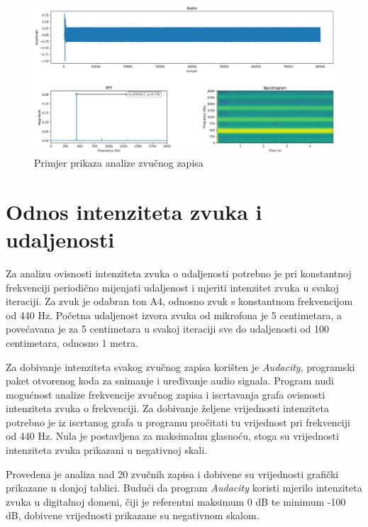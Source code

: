 \begin{figure}[ht]
	\includegraphics[width=\linewidth]{imgs/analyse_example}
	\caption{Primjer prikaza analize zvučnog zapisa}
	\label{fig:analyse_example}
\end{figure}

\section{Odnos intenziteta zvuka i udaljenosti}

Za analizu ovisnosti intenziteta zvuka o udaljenosti potrebno je pri konstantnoj frekvenciji periodično mijenjati udaljenost i mjeriti intenzitet zvuka u svakoj iteraciji. Za zvuk je odabran ton A4, odnosno zvuk s konstantnom frekvencijom od 440 Hz. Početna udaljenost izvora zvuka od mikrofona je 5 centimetara, a povećavana je za 5 centimetara u svakoj iteraciji sve do udaljenosti od 100 centimetara, odnosno 1 metra. 

Za dobivanje intenziteta svakog zvučnog zapisa korišten je \textit{Audacity}, programski paket otvorenog koda za snimanje i  uređivanje audio signala. Program nudi mogućnost analize frekvencije zvučnog zapisa i iscrtavanja grafa ovisnosti intenziteta zvuka o frekvenciji. Za dobivanje željene vrijednosti intenziteta potrebno je iz iscrtanog grafa u programu pročitati tu vrijednost pri frekvenciji od 440 Hz. Nula je postavljena za maksimalnu glasnoću, stoga su vrijednosti intenziteta zvuka prikazani u negativnoj skali. 

Provedena je analiza nad 20 zvučnih zapisa i dobivene su vrijednosti grafički prikazane u donjoj tablici. Budući da program \textit{Audacity} koristi mjerilo intenziteta zvuka u digitalnoj domeni, čiji je referentni maksimum 0 dB te minimum -100 dB, dobivene vrijednosti prikazane su negativnom skalom. 


